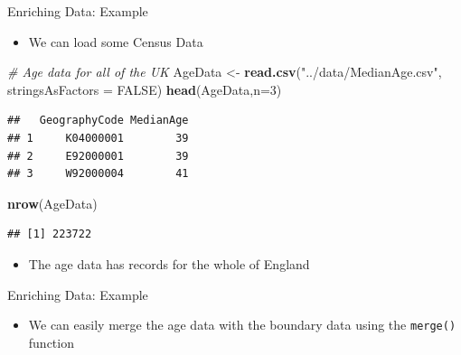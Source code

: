 \documentclass[10pt,ignorenonframetext,]{beamer}
\newenvironment{Shaded}{\begin{snugshade}}{\end{snugshade}}
\newcommand{\KeywordTok}[1]{\textcolor[rgb]{0.13,0.29,0.53}{\textbf{{#1}}}}
\newcommand{\DataTypeTok}[1]{\textcolor[rgb]{0.13,0.29,0.53}{{#1}}}
\newcommand{\DecValTok}[1]{\textcolor[rgb]{0.00,0.00,0.81}{{#1}}}
\newcommand{\StringTok}[1]{\textcolor[rgb]{0.31,0.60,0.02}{{#1}}}
\newcommand{\CommentTok}[1]{\textcolor[rgb]{0.56,0.35,0.01}{\textit{{#1}}}}
\newcommand{\OtherTok}[1]{\textcolor[rgb]{0.56,0.35,0.01}{{#1}}}
\newcommand{\NormalTok}[1]{{#1}}
\providecommand{\tightlist}{%
  \setlength{\itemsep}{0pt}\setlength{\parskip}{0pt}}
\begin{document}
\begin{frame}[fragile]{Enriching Data: Example}

\begin{itemize}
\tightlist
\item
  We can load some Census Data
\end{itemize}

\begin{Shaded}
\begin{Highlighting}[]
\CommentTok{# Age data for all of the UK}
\NormalTok{AgeData <-}\StringTok{ }\KeywordTok{read.csv}\NormalTok{(}\StringTok{"../data/MedianAge.csv"}\NormalTok{, }
                    \DataTypeTok{stringsAsFactors =} \OtherTok{FALSE}\NormalTok{)}
\KeywordTok{head}\NormalTok{(AgeData,}\DataTypeTok{n=}\DecValTok{3}\NormalTok{)}
\end{Highlighting}
\end{Shaded}

\begin{verbatim}
##   GeographyCode MedianAge
## 1     K04000001        39
## 2     E92000001        39
## 3     W92000004        41
\end{verbatim}

\begin{Shaded}
\begin{Highlighting}[]
\KeywordTok{nrow}\NormalTok{(AgeData)}
\end{Highlighting}
\end{Shaded}

\begin{verbatim}
## [1] 223722
\end{verbatim}

\begin{itemize}
\tightlist
\item
  The age data has records for the whole of England
\end{itemize}

\end{frame}

\begin{frame}[fragile]{Enriching Data: Example}

\begin{itemize}
\tightlist
\item
  We can easily merge the age data with the boundary data using the
  \texttt{merge()} function
\end{itemize}

\begin{Shaded}
\end{Shaded}

\end{frame}
\end{document}
